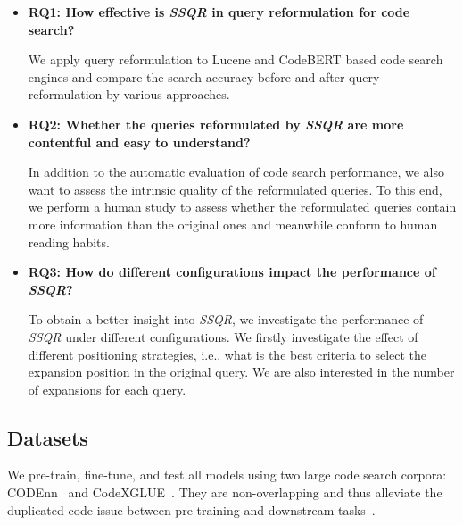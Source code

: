 \documentclass[sigconf,screen]{acmart}
\newcommand{\eg}{\hbox{e.g.}\xspace}
\newcommand{\ourmethod}{\textit{SSQR}\xspace}
\begin{document}
\begin{itemize}
    \item \textbf{RQ1: How effective is \ourmethod in query reformulation for code search?}
    
    We apply query reformulation to Lucene and CodeBERT based code search engines and compare the search accuracy before and after query reformulation by various approaches.
    
    \item \textbf{RQ2: Whether the queries reformulated by \ourmethod are more contentful and easy to understand?}
    
    In addition to the automatic evaluation of code search performance, we also want to assess the intrinsic quality of the reformulated queries. To this end, we perform a human study to assess whether the reformulated queries contain more information than the original ones and meanwhile conform to human reading habits. 
    
    \item \textbf{RQ3: How do different configurations impact the performance of \ourmethod?}

    To obtain a better insight into \ourmethod, we investigate the performance of \ourmethod under different configurations. We firstly investigate the effect of different positioning strategies, i.e., what is the best criteria to select the expansion position in the original query. We are also interested in the number of expansions for each query. 

    
\end{itemize}


\subsection{Datasets}
We pre-train, fine-tune, and test all models using two large code search corpora: CODEnn~\cite{deepcs} and CodeXGLUE~\cite{CodeXGlue}. They are non-overlapping and thus alleviate the duplicated code issue between pre-training and downstream tasks~\cite{Allamanis19}.
\end{document}

